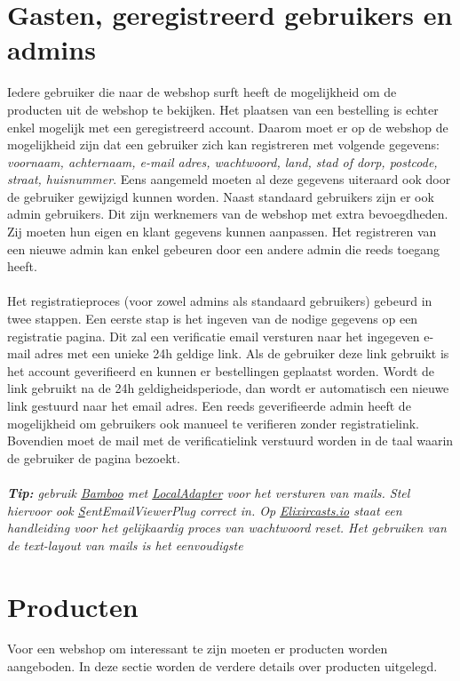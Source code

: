 \documentclass{article}
\begin{document}
\section{Gasten, geregistreerd gebruikers en admins}
Iedere gebruiker die naar de webshop surft heeft de mogelijkheid om de producten uit de webshop te bekijken. Het plaatsen van een bestelling is echter enkel mogelijk met een geregistreerd account. Daarom moet er op de webshop de mogelijkheid zijn dat een gebruiker zich kan registreren met volgende gegevens: \textit{voornaam, achternaam, e-mail adres, wachtwoord, land, stad of dorp, postcode, straat, huisnummer}. Eens aangemeld moeten al deze gegevens uiteraard ook door de gebruiker gewijzigd kunnen worden. Naast standaard gebruikers zijn er ook admin gebruikers. Dit zijn werknemers van de webshop met extra bevoegdheden. Zij moeten hun eigen en klant gegevens kunnen aanpassen. Het registreren van een nieuwe admin kan enkel gebeuren door een andere admin die reeds toegang heeft. 
\\ 
\\
Het registratieproces (voor zowel admins als standaard gebruikers) gebeurd in twee stappen. Een eerste stap is het ingeven van de nodige gegevens op een registratie pagina. Dit zal een verificatie email versturen naar het ingegeven e-mail adres met een unieke 24h geldige link. Als de gebruiker deze link gebruikt is het account geverifieerd en kunnen er bestellingen geplaatst worden. Wordt de link gebruikt na de 24h geldigheidsperiode, dan wordt er automatisch een nieuwe link gestuurd naar het email adres. Een reeds geverifieerde admin heeft de mogelijkheid om gebruikers ook manueel te verifieren zonder registratielink. Bovendien moet de mail met de verificatielink verstuurd worden in de taal waarin de gebruiker de pagina bezoekt. 
\\
\\
\textit{\textbf{Tip:} gebruik \href{https://hexdocs.pm/bamboo/1.1.0/readme.html}{Bamboo}  met \href{https://hexdocs.pm/bamboo/Bamboo.LocalAdapter.html}{LocalAdapter} voor het versturen van mails. Stel hiervoor ook \href{https://hexdocs.pm/bamboo/Bamboo.SentEmailViewerPlug.html}SentEmailViewerPlug correct in. Op \href{https://elixircasts.io/password-reset}{Elixircasts.io} staat een handleiding voor het gelijkaardig proces van wachtwoord reset. Het gebruiken van de text-layout van mails is het eenvoudigste}

\section{Producten}
Voor een webshop om interessant te zijn moeten er producten worden aangeboden. In deze sectie worden de verdere details over producten uitgelegd.
\end{document}
